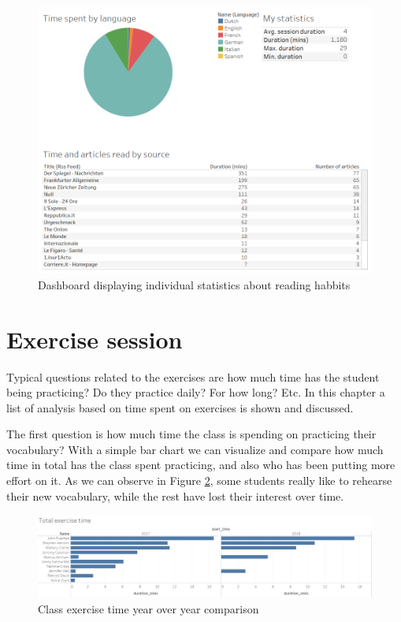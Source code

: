 \begin{figure}[!htb]
	\centering
	\includegraphics[width=1\linewidth]{gfx/Personal_dashboard}
	\caption{Dashboard displaying individual statistics about reading habbits}
	\label{fig:Personal_dashboard}
\end{figure}



\section{Exercise session}
Typical questions related to the exercises are how much time has the student being practicing? Do they practice daily? For how long? Etc. In this chapter a list of analysis based on time spent on exercises is shown and discussed.

The first question is how much time the class is spending on practicing their vocabulary? With a simple bar chart we can visualize and compare how much time in total has the class spent practicing, and also who has been putting more effort on it. As we can observe in Figure \ref{fig:Total_exercise_time}, some students really like to rehearse their new vocabulary, while the rest have lost their interest over time.

\begin{figure}[bth]
	\centering
	\includegraphics[width=1\linewidth]{gfx/Total_exercise_time}
	\caption{Class exercise time year over year comparison}
	\label{fig:Total_exercise_time}
\end{figure}

